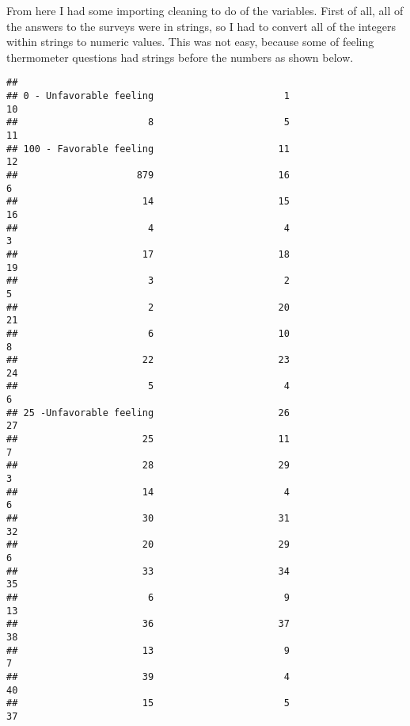 \documentclass[
]{article}
\newenvironment{Shaded}{\begin{snugshade}}{\end{snugshade}}
\newcommand{\FunctionTok}[1]{\textcolor[rgb]{0.00,0.00,0.00}{#1}}
\newcommand{\NormalTok}[1]{#1}
\newcommand{\SpecialCharTok}[1]{\textcolor[rgb]{0.00,0.00,0.00}{#1}}
\begin{document}
From here I had some importing cleaning to do of the variables. First of
all, all of the answers to the surveys were in strings, so I had to
convert all of the integers within strings to numeric values. This was
not easy, because some of feeling thermometer questions had strings
before the numbers as shown below.

\begin{Shaded}
\end{Shaded}

\begin{verbatim}
## 
## 0 - Unfavorable feeling                       1                      10 
##                       8                       5                      11 
## 100 - Favorable feeling                      11                      12 
##                     879                      16                       6 
##                      14                      15                      16 
##                       4                       4                       3 
##                      17                      18                      19 
##                       3                       2                       5 
##                       2                      20                      21 
##                       6                      10                       8 
##                      22                      23                      24 
##                       5                       4                       6 
## 25 -Unfavorable feeling                      26                      27 
##                      25                      11                       7 
##                      28                      29                       3 
##                      14                       4                       6 
##                      30                      31                      32 
##                      20                      29                       6 
##                      33                      34                      35 
##                       6                       9                      13 
##                      36                      37                      38 
##                      13                       9                       7 
##                      39                       4                      40 
##                      15                       5                      37 

\end{verbatim}
\end{document}
